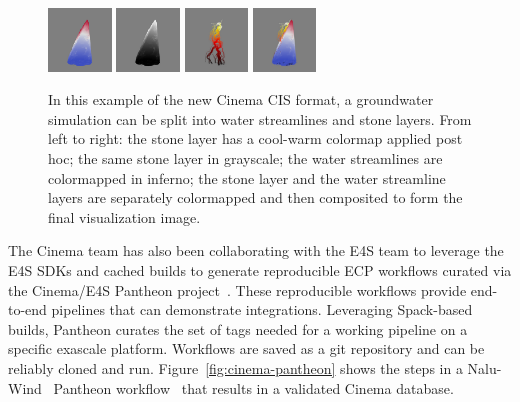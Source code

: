 \begin{figure}[htb]
	\centering
	\includegraphics[width=0.15\textwidth]{projects/2.3.6-NNSA/2.3.6.01-LANL-ATDM/cinema-cis-stone-coolwarm.png}
	\includegraphics[width=0.15\textwidth]{projects/2.3.6-NNSA/2.3.6.01-LANL-ATDM/cinema-cis-stone-grayscale.png}
	\includegraphics[width=0.15\textwidth]{projects/2.3.6-NNSA/2.3.6.01-LANL-ATDM/cinema-cis-streamlines.png}
	\includegraphics[width=0.15\textwidth]{projects/2.3.6-NNSA/2.3.6.01-LANL-ATDM/cinema-cis-stone-water.png}
	\caption{
		In this example of the new Cinema CIS format, a groundwater simulation can be split into water streamlines and stone layers.  From left to right: the stone layer has a cool-warm colormap applied post hoc; the same stone layer in grayscale;  the water streamlines are colormapped in inferno;  the stone layer and the water streamline layers are separately colormapped and then composited to form the final visualization image.  
		\label{fig:cinema-cis}
	}
\end{figure}

The Cinema team has also been collaborating with the E4S team to leverage the E4S SDKs and cached builds to generate reproducible ECP workflows curated via the Cinema/E4S Pantheon project~\cite{pantheon:web}.   These reproducible workflows provide end-to-end pipelines that can demonstrate integrations.   Leveraging Spack-based builds, Pantheon curates the set of tags needed for a working pipeline on a specific exascale platform.  Workflows are saved as a git repository and can be reliably cloned and run.  Figure~\ref{fig:cinema-pantheon} shows the steps in a Nalu-Wind~\cite{naluwind:2020} Pantheon workflow~\cite{pantheon:naluwind} that results in a validated Cinema database.  


